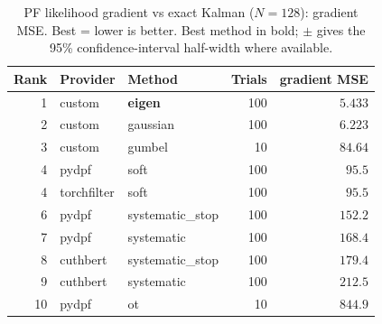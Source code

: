 \begin{table}[!htbp]
\centering
\small
\caption{PF likelihood gradient vs exact Kalman ($N=128$): gradient MSE. Best = lower is better. Best method in bold; $\pm$ gives the 95\% confidence-interval half-width where available.}
\label{tab:pf-likelihood-gradient-vs-exact-kalman-gradient-mse}
\begin{tabular}{rllrr}
\toprule
Rank & Provider & Method & Trials & gradient MSE \\
\midrule
1 & custom & \textbf{eigen} & 100 & $\mathbf{5.433}$ \\
2 & custom & gaussian & 100 & $6.223$ \\
3 & custom & gumbel & 10 & $84.64$ \\
4 & pydpf & soft & 100 & $95.5$ \\
4 & torchfilter & soft & 100 & $95.5$ \\
6 & pydpf & systematic\_stop & 100 & $152.2$ \\
7 & pydpf & systematic & 100 & $168.4$ \\
8 & cuthbert & systematic\_stop & 100 & $179.4$ \\
9 & cuthbert & systematic & 100 & $212.5$ \\
10 & pydpf & ot & 10 & $844.9$ \\
\bottomrule
\end{tabular}
\end{table}
